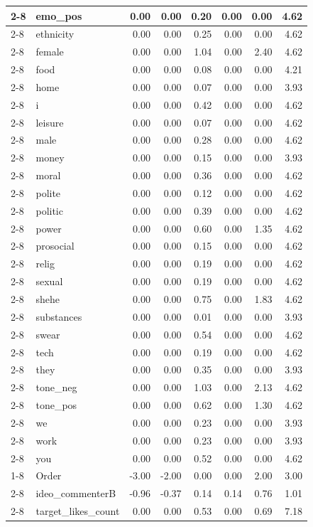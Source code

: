 \documentclass{article}
\begin{document}
\begin{table}[h]
\begin{tabular}[t]{l|l|r|r|r|r|r|r}
\cline{2-8}
 & emo\_pos & 0.00 & 0.00 & 0.20 & 0.00 & 0.00 & 4.62\\
\cline{2-8}
 & ethnicity & 0.00 & 0.00 & 0.25 & 0.00 & 0.00 & 4.62\\
\cline{2-8}
 & female & 0.00 & 0.00 & 1.04 & 0.00 & 2.40 & 4.62\\
\cline{2-8}
 & food & 0.00 & 0.00 & 0.08 & 0.00 & 0.00 & 4.21\\
\cline{2-8}
 & home & 0.00 & 0.00 & 0.07 & 0.00 & 0.00 & 3.93\\
\cline{2-8}
 & i & 0.00 & 0.00 & 0.42 & 0.00 & 0.00 & 4.62\\
\cline{2-8}
 & leisure & 0.00 & 0.00 & 0.07 & 0.00 & 0.00 & 4.62\\
\cline{2-8}
 & male & 0.00 & 0.00 & 0.28 & 0.00 & 0.00 & 4.62\\
\cline{2-8}
 & money & 0.00 & 0.00 & 0.15 & 0.00 & 0.00 & 3.93\\
\cline{2-8}
 & moral & 0.00 & 0.00 & 0.36 & 0.00 & 0.00 & 4.62\\
\cline{2-8}
 & polite & 0.00 & 0.00 & 0.12 & 0.00 & 0.00 & 4.62\\
\cline{2-8}
 & politic & 0.00 & 0.00 & 0.39 & 0.00 & 0.00 & 4.62\\
\cline{2-8}
 & power & 0.00 & 0.00 & 0.60 & 0.00 & 1.35 & 4.62\\
\cline{2-8}
 & prosocial & 0.00 & 0.00 & 0.15 & 0.00 & 0.00 & 4.62\\
\cline{2-8}
 & relig & 0.00 & 0.00 & 0.19 & 0.00 & 0.00 & 4.62\\
\cline{2-8}
 & sexual & 0.00 & 0.00 & 0.19 & 0.00 & 0.00 & 4.62\\
\cline{2-8}
 & shehe & 0.00 & 0.00 & 0.75 & 0.00 & 1.83 & 4.62\\
\cline{2-8}
 & substances & 0.00 & 0.00 & 0.01 & 0.00 & 0.00 & 3.93\\
\cline{2-8}
 & swear & 0.00 & 0.00 & 0.54 & 0.00 & 0.00 & 4.62\\
\cline{2-8}
 & tech & 0.00 & 0.00 & 0.19 & 0.00 & 0.00 & 4.62\\
\cline{2-8}
 & they & 0.00 & 0.00 & 0.35 & 0.00 & 0.00 & 3.93\\
\cline{2-8}
 & tone\_neg & 0.00 & 0.00 & 1.03 & 0.00 & 2.13 & 4.62\\
\cline{2-8}
 & tone\_pos & 0.00 & 0.00 & 0.62 & 0.00 & 1.30 & 4.62\\
\cline{2-8}
 & we & 0.00 & 0.00 & 0.23 & 0.00 & 0.00 & 3.93\\
\cline{2-8}
 & work & 0.00 & 0.00 & 0.23 & 0.00 & 0.00 & 3.93\\
\cline{2-8}
\multirow{\raggedright\arraybackslash LIWC} & you & 0.00 & 0.00 & 0.52 & 0.00 & 0.00 & 4.62\\
\cline{1-8}
 & Order & -3.00 & -2.00 & 0.00 & 0.00 & 2.00 & 3.00\\
\cline{2-8}
 & ideo\_commenterB & -0.96 & -0.37 & 0.14 & 0.14 & 0.76 & 1.01\\
\cline{2-8}
\multirow{\raggedright\arraybackslash Other} & target\_likes\_count & 0.00 & 0.00 & 0.53 & 0.00 & 0.69 & 7.18\\
\hline
\end{tabular}
\end{table}
\end{document}
